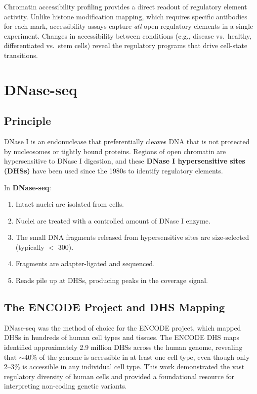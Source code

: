 Chromatin accessibility profiling provides a direct readout of regulatory element activity. Unlike histone modification mapping, which requires specific antibodies for each mark, accessibility assays capture \textit{all} open regulatory elements in a single experiment. Changes in accessibility between conditions (e.g., disease vs.\ healthy, differentiated vs.\ stem cells) reveal the regulatory programs that drive cell-state transitions.

\section{DNase-seq}
\label{sec:chromatin:dnase}

\subsection{Principle}
\label{subsec:chromatin:dnase-principle}

DNase I is an endonuclease that preferentially cleaves DNA that is not protected by nucleosomes or tightly bound proteins. Regions of open chromatin are hypersensitive to DNase I digestion, and these \textbf{DNase I hypersensitive sites (DHSs)} have been used since the 1980s to identify regulatory elements.

In \textbf{DNase-seq}:
\begin{enumerate}[itemsep=2pt]
  \item Intact nuclei are isolated from cells.
  \item Nuclei are treated with a controlled amount of DNase I enzyme.
  \item The small DNA fragments released from hypersensitive sites are size-selected (typically $<$ 300\basepair{}).
  \item Fragments are adapter-ligated and sequenced.
  \item Reads pile up at DHSs, producing peaks in the coverage signal.
\end{enumerate}

\subsection{The ENCODE Project and DHS Mapping}
\label{subsec:chromatin:encode}

DNase-seq was the method of choice for the \acrfull{ENCODE} project, which mapped DHSs in hundreds of human cell types and tissues. The ENCODE DHS maps identified approximately 2.9 million DHSs across the human genome, revealing that $\sim$40\% of the genome is accessible in at least one cell type, even though only 2--3\% is accessible in any individual cell type. This work demonstrated the vast regulatory diversity of human cells and provided a foundational resource for interpreting non-coding genetic variants.

